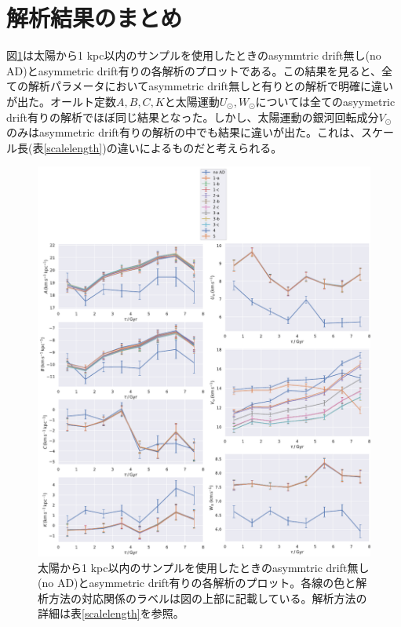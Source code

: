 
\section{解析結果のまとめ}
図\ref{multi}は太陽から1 kpc以内のサンプルを使用したときのasymmtric drift無し(no AD)とasymmetric drift有りの各解析のプロットである。この結果を見ると、全ての解析パラメータにおいてasymmetric drift無しと有りとの解析で明確に違いが出た。オールト定数$A,B,C,K$と太陽運動$U_{\odot},W_{\odot}$については全てのasyymetric drift有りの解析でほぼ同じ結果となった。しかし、太陽運動の銀河回転成分$V_{\odot}$のみはasymmetric drift有りの解析の中でも結果に違いが出た。これは、スケール長(表\ref{scalelength})の違いによるものだと考えられる。
\begin{figure}[htbp]
\begin{center}
	\includegraphics[width=15cm]{fig/multi/multi.pdf}
	\caption{太陽から1 kpc以内のサンプルを使用したときのasymmtric drift無し(no AD)とasymmetric drift有りの各解析のプロット。各線の色と解析方法の対応関係のラベルは図の上部に記載している。解析方法の詳細は表\ref{scalelength}を参照。}
	\label{multi}
\end{center}
\end{figure}